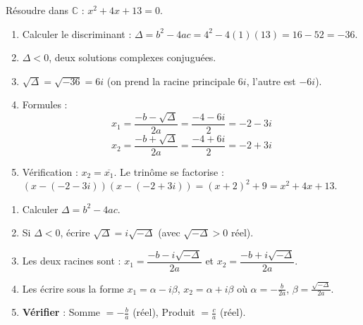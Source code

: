 \documentclass[11pt]{article}
\begin{document}
\begin{exemplebox}
Résoudre dans $\mathbb{C}$ : $x^2 + 4x + 13 = 0$.
\begin{enumerate}
    \item Calculer le discriminant : $\Delta = b^2 - 4ac = 4^2 - 4(1)(13) = 16 - 52 = -36$.
    \item $\Delta < 0$, deux solutions complexes conjuguées.
    \item $\sqrt{\Delta} = \sqrt{-36} = 6i$ (on prend la racine principale $6i$, l'autre est $-6i$).
    \item Formules :
    \[
    x_1 = \frac{-b - \sqrt{\Delta}}{2a} = \frac{-4 - 6i}{2} = -2 - 3i
    \]
    \[
    x_2 = \frac{-b + \sqrt{\Delta}}{2a} = \frac{-4 + 6i}{2} = -2 + 3i
    \]
    \item Vérification : $x_2 = \overline{x_1}$. Le trinôme se factorise : $(x - (-2-3i))(x - (-2+3i)) = (x+2)^2 + 9 = x^2+4x+13$.
\end{enumerate}
\end{exemplebox}

\begin{methode}[Trouver les racines d'un trinôme $ax^2+bx+c=0$ ($a,b,c \in \mathbb{R}, a\neq 0$) à discriminant négatif]
\begin{enumerate}
    \item Calculer $\Delta = b^2 - 4ac$.
    \item Si $\Delta < 0$, écrire $\sqrt{\Delta} = i\sqrt{-\Delta}$ (avec $\sqrt{-\Delta} > 0$ réel).
    \item Les deux racines sont : $x_1 = \dfrac{-b - i\sqrt{-\Delta}}{2a}$ et $x_2 = \dfrac{-b + i\sqrt{-\Delta}}{2a}$.
    \item Les écrire sous la forme $x_1 = \alpha - i\beta$, $x_2 = \alpha + i\beta$ où $\alpha = -\frac{b}{2a}$, $\beta = \frac{\sqrt{-\Delta}}{2a}$.
    \item \textbf{Vérifier} : Somme $= -\frac{b}{a}$ (réel), Produit $= \frac{c}{a}$ (réel).
\end{enumerate}
\end{methode}
\end{document}
